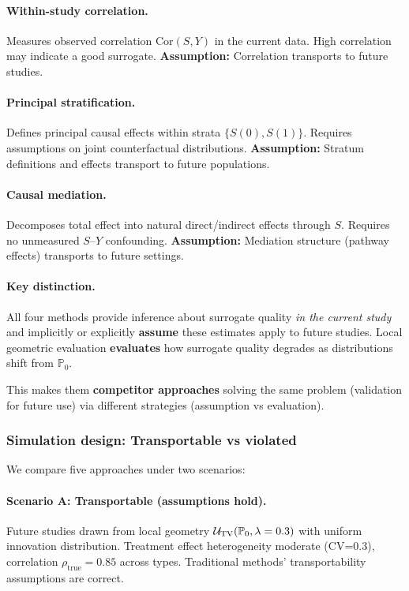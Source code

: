\documentclass{article}
\newcommand{\PP}{\mathbb{P}}
\begin{document}
\paragraph{Within-study correlation.}
Measures observed correlation $\text{Cor}(S, Y)$ in the current data. High correlation may indicate a good surrogate. \textbf{Assumption:} Correlation transports to future studies.

\paragraph{Principal stratification.}
Defines principal causal effects within strata $\{S(0), S(1)\}$. Requires assumptions on joint counterfactual distributions. \textbf{Assumption:} Stratum definitions and effects transport to future populations.

\paragraph{Causal mediation.}
Decomposes total effect into natural direct/indirect effects through $S$. Requires no unmeasured $S$--$Y$ confounding. \textbf{Assumption:} Mediation structure (pathway effects) transports to future settings.

\paragraph{Key distinction.}
All four methods provide inference about surrogate quality \emph{in the current study} and implicitly or explicitly \textbf{assume} these estimates apply to future studies. Local geometric evaluation \textbf{evaluates} how surrogate quality degrades as distributions shift from $\PP_0$.

This makes them \textbf{competitor approaches} solving the same problem (validation for future use) via different strategies (assumption vs evaluation).

\subsubsection{Simulation design: Transportable vs violated}

We compare five approaches under two scenarios:

\paragraph{Scenario A: Transportable (assumptions hold).}
Future studies drawn from local geometry $\cU_{\mathrm{TV}}(\PP_0, \lambda=0.3)$ with uniform innovation distribution. Treatment effect heterogeneity moderate (CV=0.3), correlation $\rho_{\text{true}} = 0.85$ across types. Traditional methods' transportability assumptions are correct.
\end{document}
